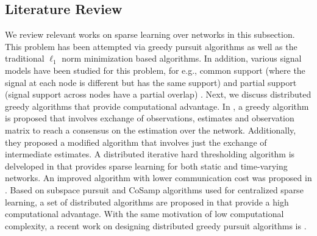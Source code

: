 \documentclass[journal]{IEEEtran}
\begin{document}
\subsection{Literature Review}
\label{subsec:lit_review}
We review relevant works on sparse learning over networks in this subsection. This problem has been attempted via greedy pursuit algorithms as well as the traditional $\ell_1$ norm minimization based algorithms. In addition, various signal models have been studied for this problem, for e.g., common support (where the signal at each node is different but has the same support) \cite{Varshaney_OMP_joint_sparsity_pattern_recovery_TSP_2014} and partial support (signal support across nodes have a partial overlap) \cite{Sundman_Chatterjee_Skoglund_DistributedGreedyPursuits_2014, saikat_DIPP_TSP_2016}. Next, we discuss distributed greedy algorithms that provide computational advantage. In \cite{Sergios_greedy_sparsity_algorithm_distributed_learning_TSP_2015}, a greedy algorithm is proposed that involves exchange of observations, estimates and observation matrix to reach a consensus on the estimation over the network. Additionally, they proposed a modified algorithm that involves just the exchange of intermediate estimates. A distributed iterative hard thresholding algorithm is delveloped in \cite{Eldar_DCS_static_time_varying_network_TSP_2014} that provides sparse learning for both static and time-varying networks. An improved algorithm with lower communication cost was proposed in \cite{Eldar_mod_DIHT_ICASSP_2015}. Based on subspace pursuit \cite{Dai_2009_Subspace_pursuit} and CoSamp \cite{Needell_Tropp_2008_CoSaMP} algorithms used for centralized sparse learning, a set of distributed algorithms are proposed in \cite{Sundman_Chatterjee_Skoglund_DistributedGreedyPursuits_2014, Sundman_Chatterjee_Skoglund_2016} that provide a high computational advantage. With the same motivation of low computational complexity, a recent work on designing distributed greedy pursuit algorithms is \cite{Zaki_Venkitaraman_Chatterjee_Rasmussen_GreedySparseLearningOverNetwork_TSIPN_2017}.
\end{document}
